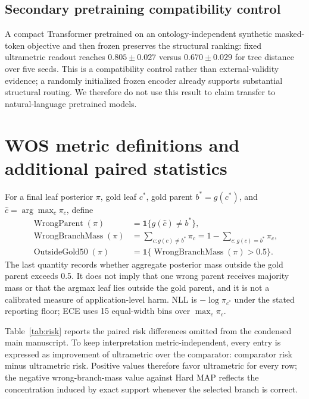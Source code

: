 \documentclass[11pt]{article}
\begin{document}
\subsection{Secondary pretraining compatibility control}
A compact Transformer pretrained on an ontology-independent synthetic masked-token objective and then frozen preserves the structural ranking: fixed ultrametric readout reaches $0.805\pm0.027$ versus $0.670\pm0.029$ for tree distance over five seeds. This is a compatibility control rather than external-validity evidence; a randomly initialized frozen encoder already supports substantial structural routing. We therefore do not use this result to claim transfer to natural-language pretrained models.

\section{WOS metric definitions and additional paired statistics}
For a final leaf posterior $\pi$, gold leaf $c^*$, gold parent $b^*=g(c^*)$, and $\widehat c=\arg\max_c\pi_c$, define
\begin{align}
\operatorname{WrongParent}(\pi)&=\mathbf1\{g(\widehat c)\neq b^*\},\\
\operatorname{WrongBranchMass}(\pi)&=\sum_{c:g(c)\neq b^*}\pi_c
=1-\sum_{c:g(c)=b^*}\pi_c,\\
\operatorname{OutsideGold50}(\pi)&=\mathbf1\{\operatorname{WrongBranchMass}(\pi)>0.5\}.
\end{align}
The last quantity records whether aggregate posterior mass outside the gold parent exceeds 0.5. It does not imply that one wrong parent receives majority mass or that the argmax leaf lies outside the gold parent, and it is not a calibrated measure of application-level harm. NLL is $-\log\pi_{c^*}$ under the stated reporting floor; ECE uses 15 equal-width bins over $\max_c\pi_c$.

Table~\ref{tab:risk} reports the paired risk differences omitted from the condensed main manuscript. To keep interpretation metric-independent, every entry is expressed as improvement of ultrametric over the comparator: comparator risk minus ultrametric risk. Positive values therefore favor ultrametric for every row; the negative wrong-branch-mass value against Hard MAP reflects the concentration induced by exact support whenever the selected branch is correct.
\end{document}
